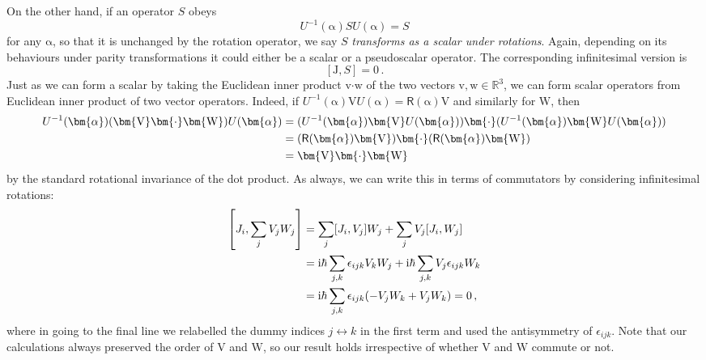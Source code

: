 \documentclass{article}
\theoremstyle{plain}\theoremheaderfont{\normalfont\itshape}\theorembodyfont{\rmfamily}\theoremseparator{.}\newtheorem*{rem}{Remark}\newtheorem*{ex}{Example}\newtheorem*{proof}{Proof}\newtheorem*{altp}{Alternative proof}
\theoremstyle{plain}\theoremheaderfont{\normalfont\bfseries}\theorembodyfont{\rmfamily}\theoremseparator{.}\newtheorem{thm}{Theorem}[section]\newtheorem{lem}[thm]{Lemma}\newtheorem{prop}[thm]{Proposition}\newtheorem*{cor}{Corollary}\newtheorem{defn}[thm]{Definition}\newtheorem{clm}[thm]{Claim}\newtheorem{clminproof}{Claim}
\theoremstyle{break}\theoremheaderfont{\normalfont\itshape}\theorembodyfont{\rmfamily}\theoremseparator{.\medskip}\newtheorem*{proofskip}{Proof}\newtheorem*{exs}{Examples}\newtheorem*{rems}{Remarks}
\theoremstyle{break}\theoremheaderfont{\normalfont\bfseries}\theorembodyfont{\rmfamily}\theoremseparator{.\medskip}\newtheorem{lemskip}[thm]{Lemma}\newtheorem{defnskip}[thm]{Definition}\newtheorem{propskip}[thm]{Proposition}\newtheorem{thmskip}[thm]{Theorem}
\numberwithin{equation}{section}
\newcommand{\ii}{\mathrm{i}}
\newcommand{\vb}[1]{\bm{\mathrm{#1}}}
\newcommand{\vdot}{\bm{\cdot}}
\newcommand{\RR}{\mathbb{R}}
\begin{document}
    On the other hand, if an operator \(S\) obeys
    \begin{equation}
        U^{-1}(\vb{\alpha})SU(\vb{\alpha})=S
    \end{equation}
    for any \(\vb{\alpha}\), so that it is unchanged by the rotation operator, we say \(S\) \textit{transforms as a scalar under rotations}. Again, depending on its behaviours under parity transformations it could either be a scalar or a pseudoscalar operator. The corresponding infinitesimal version is
    \begin{equation}\label{angular_momentum_scalar_commutation}
        [\vb{J},S]=0\,.
    \end{equation}
    Just as we can form a scalar by taking the Euclidean inner product \(\vb{v}\vdot\vb{w}\) of the two vectors \(\vb{v},\vb{w}\in\RR^3\), we can form scalar operators from Euclidean inner product of two vector operators. Indeed, if \(U^{-1}(\vb{\alpha})\vb{V}U(\vb{\alpha})=\mathsf{R}(\vb{\alpha})\vb{V}\) and similarly for \(\vb{W}\), then
    \begin{align}
        U^{-1}(\vb{\alpha})(\vb{V}\vdot\vb{W})U(\vb{\alpha})&=(U^{-1}(\vb{\alpha})\vb{V}U(\vb{\alpha}))\vdot(U^{-1}(\vb{\alpha})\vb{W}U(\vb{\alpha}))\notag\\
        &=(\mathsf{R}(\vb{\alpha})\vb{V})\vdot(\mathsf{R}(\vb{\alpha})\vb{W})\notag\\
        &=\vb{V}\vdot\vb{W}
    \end{align}
    by the standard rotational invariance of the dot product. As always, we can write this in
    terms of commutators by considering infinitesimal rotations:
    \begin{align}
        \left[J_i,\sum_j V_jW_j\right]&=\sum_j[J_i,V_j]W_j+\sum_jV_j[J_i,W_j]\notag\\
        &=\ii\hbar\sum_{j,k}\epsilon_{ijk}V_kW_j+\ii\hbar\sum_{j,k}V_j\epsilon_{ijk}W_k\notag\\
        &=\ii\hbar\sum_{j,k}\epsilon_{ijk}(-V_jW_k+V_jW_k)=0\,,
    \end{align}
    where in going to the final line we relabelled the dummy indices \(j\leftrightarrow k\) in the first term and used the antisymmetry of \(\epsilon_{ijk}\). Note that our calculations always preserved the order of \(\vb{V}\) and \(\vb{W}\), so our result holds irrespective of whether \(\vb{V}\) and \(\vb{W}\) commute or not.
\end{document}

